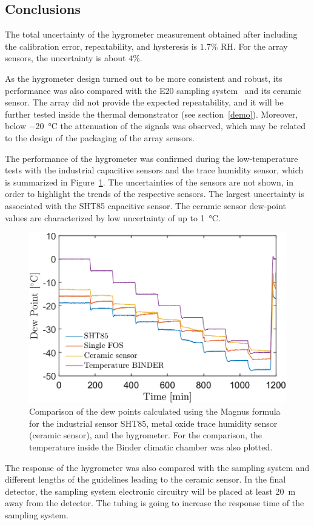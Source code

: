 \subsection{Conclusions}
The total uncertainty of the hygrometer measurement obtained after including the calibration error, repeatability, and hysteresis is $1.7$\% RH. For the array sensors, the uncertainty is about $4\%$.


As the hygrometer design turned out to be more consistent and robust, its performance was also compared with the E20 sampling system~\cite{michell_e20} and its ceramic sensor. The array did not provide the expected repeatability, and it  will be further tested inside the thermal demonstrator (see section~\ref{demo}). Moreover, below \SI{-20}{\celsius} the attenuation of the signals was observed, which may be related to the design of the packaging of the array sensors.

The performance of the hygrometer was confirmed during the low-temperature tests with the industrial capacitive sensors and the trace humidity sensor, which is summarized in Figure~\ref{fig_comparison}. The uncertainties of the sensors are not shown, in order to highlight the trends of the respective sensors. The largest uncertainty is associated with the SHT85 capacitive sensor. The ceramic sensor dew-point values are characterized by low uncertainty of up to \SI{1}{\celsius}.  
\begin{figure}[!h]
\centering
\includegraphics[width=0.6\columnwidth]{Chapter5/images/DPCPercent.png}
\caption{Comparison of the dew points calculated using the Magnus formula for the industrial sensor SHT85, metal oxide trace humidity sensor (ceramic sensor), and the hygrometer. For the comparison, the temperature inside the Binder climatic chamber was also plotted.}
\label{fig_comparison}
\end{figure}

The response of the hygrometer was also compared with the sampling system and different lengths of the guidelines leading to the ceramic sensor. In the final detector, the sampling system electronic circuitry will be placed at least \SI{20}{\metre} away from the detector. The tubing is going to increase the response time of the sampling system. 

